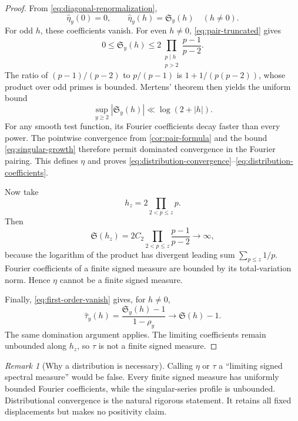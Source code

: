 \documentclass[11pt]{article}
\theoremstyle{definition}
\theoremstyle{remark}
\newtheorem{remark}[theorem]{Remark}
\begin{document}
\begin{proof}
From \eqref{eq:diagonal-renormalization},
\begin{equation}\label{eq:eta-y-coefficients}
    \widehat\eta_y(0)=0,
    \qquad
    \widehat\eta_y(h)=\mathfrak S_y(h)\quad(h\ne0).
\end{equation}
For odd $h$, these coefficients vanish.  For even $h\ne0$, \eqref{eq:pair-truncated} gives
\[
 0\le\mathfrak S_y(h)
 \le2\prod_{\substack{p\mid h\\p>2}}\frac{p-1}{p-2}.
\]
The ratio of $(p-1)/(p-2)$ to $p/(p-1)$ is $1+1/(p(p-2))$, whose product over odd primes is bounded.  Mertens' theorem then yields the uniform bound
\begin{equation}\label{eq:singular-growth}
    \sup_{y\ge2}|\mathfrak S_y(h)|
    \ll\log(2+|h|).
\end{equation}
For any smooth test function, its Fourier coefficients decay faster than every power.  The pointwise convergence from \cref{cor:pair-formula} and the bound \eqref{eq:singular-growth} therefore permit dominated convergence in the Fourier pairing.  This defines $\eta$ and proves \eqref{eq:distribution-convergence}--\eqref{eq:distribution-coefficients}.

Now take
\[
    h_z=2\prod_{2<p\le z}p.
\]
Then
\[
 \mathfrak S(h_z)
 =2C_2\prod_{2<p\le z}\frac{p-1}{p-2}\longrightarrow\infty,
\]
because the logarithm of the product has divergent leading sum $\sum_{p\le z}1/p$.  Fourier coefficients of a finite signed measure are bounded by its total-variation norm.  Hence $\eta$ cannot be a finite signed measure.

Finally, \eqref{eq:first-order-vanish} gives, for $h\ne0$,
\[
 \widehat\tau_y(h)
 =\frac{\mathfrak S_y(h)-1}{1-\rho_y}
 \longrightarrow\mathfrak S(h)-1.
\]
The same domination argument applies.  The limiting coefficients remain unbounded along $h_z$, so $\tau$ is not a finite signed measure.
\end{proof}

\begin{remark}[Why a distribution is necessary]\label{rem:distribution-not-measure}
Calling $\eta$ or $\tau$ a ``limiting signed spectral measure'' would be false.  Every finite signed measure has uniformly bounded Fourier coefficients, while the singular-series profile is unbounded.  Distributional convergence is the natural rigorous statement.  It retains all fixed displacements but makes no positivity claim.
\end{remark}
\end{document}
